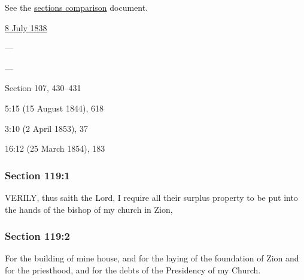 		See the \href{https://drive.google.com/file/d/1goAvNz8jS4R8slYfMG_db55Ty2z_vmgK/view?usp=sharing}{sections comparison} document.
	
		\begin{compactdesc}
			\item[JSP] \hyperref[EMS-1838-JS-8-JUL-1838-C]{8 July 1838}
			\item[BC] ---
			\item[DC 1835] ---
			\item[DC 1844] Section 107, 430--431
			\item[TS] 5:15 (15 August 1844), 618
			\item[DN] 3:10 (2 April 1853), 37
			\item[MS] 16:12 (25 March 1854), 183
		\end{compactdesc}

	\subsubsection{Section 119:1} %
		\label{DC119-1}

		VERILY, thus saith the Lord, I require all their surplus property to be put into the hands of the bishop of my church in Zion,


	\subsubsection{Section 119:2} %
		\label{DC119-2}

		For the building of mine house, and for the laying of the foundation of Zion and for the priesthood, and for the debts of the Presidency of my Church.


